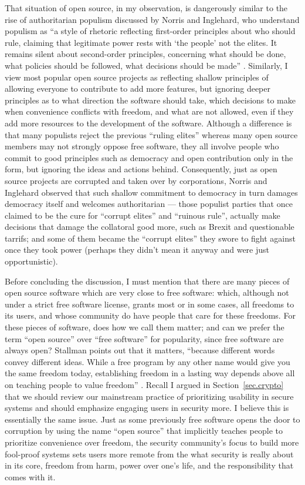 \documentclass[10pt]{article}
\begin{document}
That situation of open source, in my observation, is dangerously similar to the
rise of authoritarian populism discussed by Norris and Inglehard, who
understand populism as ``a style of rhetoric reflecting first-order principles
about who should rule, claiming that legitimate power rests with `the people'
not the elites. It remains silent about second-order principles, concerning
what should be done, what policies should be followed, what decisions should be
made'' \cite[p.~4]{cultural.backlash}. Similarly, I view most popular open
source projects as reflecting shallow principles of allowing everyone to
contribute to add more features, but ignoring deeper principles as to what
direction the software should take, which decisions to make when convenience
conflicts with freedom, and what are not allowed, even if they add more
resources to the development of the software. Although a difference is that
many populists reject the previous ``ruling elites'' whereas many open source
members may not strongly oppose free software, they all involve people who
commit to good principles such as democracy and open contribution only in the
form, but ignoring the ideas and actions behind.  Consequently, just as open
source projects are corrupted and taken over by corporations, Norris and
Inglehard observed that such shallow commitment to democracy in turn damages
democracy itself and welcomes authoritarian \cite{cultural.backlash} --- those
populist parties that once claimed to be the cure for ``corrupt elites'' and
``ruinous rule'', actually make decisions that damage the collatoral good more,
such as Brexit and questionable tarrifs; and some of them became the ``corrupt
elites'' they swore to fight against once they took power (perhaps they didn't
mean it anyway and were just opportunistic). 

Before concluding the discussion, I must mention that there are many pieces of
open source software which are very close to free software: which, although not
under a strict free software license, grants most or in some cases, all
freedoms to its users, and whose community do have people that care for these
freedoms. For these pieces of software, does how we call them matter; and can we
prefer the term ``open source'' over ``free software'' for popularity, since
free software are always open? Stallman points out that it matters, ``because
different words convey different ideas. While a free program by any other name
would give you the same freedom today, establishing freedom in a lasting way
depends above all on teaching people to value freedom''
\cite[Essay~14]{stallman.essays}. Recall I argued in Section~\ref{sec.crypto}
that we should review our mainstream practice of prioritizing usability in
secure systems and should emphasize engaging users in security more. I believe
this is essentially the same issue. Just as some previously free software opens
the door to corruption by using the name ``open source'' that implicitly
teaches people to prioritize convenience over freedom, the security community's
focus to build more fool-proof systems sets users more remote from the what
security is really about in its core, freedom from harm, power over one's life,
and the responsibility that comes with it.
\end{document}
